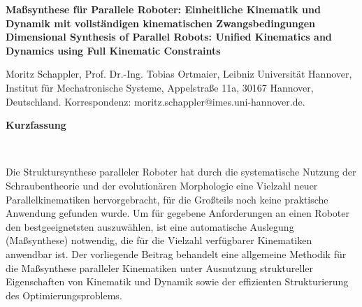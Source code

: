 \documentclass[fleqn,a4paper,10pt]{article}
\newenvironment{mytitle}{\fontsize{16pt}{1.0} \selectfont \bfseries}{\\}
\newenvironment*{myabstract}{\begin{Large}\bfseries}{\end{Large}\\[6pt]}%
\begin{document}
\begin{mytitle} 
Maßsynthese für Parallele Roboter: Einheitliche Kinematik und Dynamik mit vollständigen kinematischen Zwangsbedingungen \\[6pt] %
Dimensional Synthesis of Parallel Robots: Unified Kinematics and Dynamics using Full Kinematic Constraints
\end{mytitle}

Moritz Schappler, Prof. Dr.-Ing. Tobias Ortmaier, Leibniz Universität Hannover, Institut für Mechatronische Systeme, Appelstraße 11a, 30167 Hannover, Deutschland. Korrespondenz: moritz.schappler@imes.uni-hannover.de.

\vspace{24pt} %

\begin{myabstract} Kurzfassung \end{myabstract}

Die Struktursynthese paralleler Roboter hat durch die systematische Nutzung der Schraubentheorie \cite{KongGos2007} und der evolutionären Morphologie \cite{Gogu2008} eine Vielzahl neuer Parallelkinematiken hervorgebracht, für die Großteils noch keine praktische Anwendung gefunden wurde.
Um für gegebene Anforderungen an einen Roboter den bestgeeignetsten auszuwählen, ist eine automatische Auslegung (Maßsynthese) notwendig, die für die Vielzahl verfügbarer Kinematiken anwendbar ist.
Der vorliegende Beitrag behandelt eine allgemeine Methodik für die Maßsynthese paralleler Kinematiken unter Ausnutzung struktureller Eigenschaften von Kinematik und Dynamik sowie der effizienten Strukturierung des Optimierungsproblems.
\end{document}
